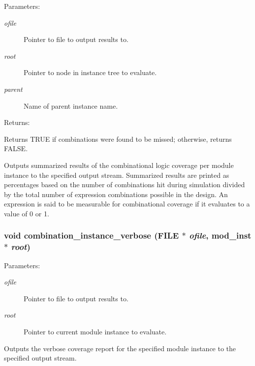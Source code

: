 \begin{Desc}
\item[Parameters: ]\par
\begin{description}
\item[{\em 
ofile}]Pointer to file to output results to. \item[{\em 
root}]Pointer to node in instance tree to evaluate. \item[{\em 
parent}]Name of parent instance name.\end{description}
\end{Desc}
\begin{Desc}
\item[Returns: ]\par
Returns TRUE if combinations were found to be missed; otherwise, returns FALSE.\end{Desc}
Outputs summarized results of the combinational logic coverage per module instance to the specified output stream. Summarized results are printed  as percentages based on the number of combinations hit during simulation  divided by the total number of expression combinations possible in the  design. An expression is said to be measurable for combinational coverage  if it evaluates to a value of 0 or 1. 
\subsubsection{\setlength{\rightskip}{0pt plus 5cm}void combination\_\-instance\_\-verbose (FILE $\ast$ {\em ofile}, {\bf mod\_\-inst} $\ast$ {\em root})}\label{comb_8c_a18}


\begin{Desc}
\item[Parameters: ]\par
\begin{description}
\item[{\em 
ofile}]Pointer to file to output results to. \item[{\em 
root}]Pointer to current module instance to evaluate.\end{description}
\end{Desc}
Outputs the verbose coverage report for the specified module instance to the specified output stream. 
